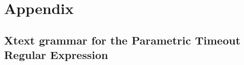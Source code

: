 \appendix
\chapter*{Appendix}

\setcounter{chapter}{1} %

\section{Xtext grammar for the Parametric Timeout Regular Expression}


